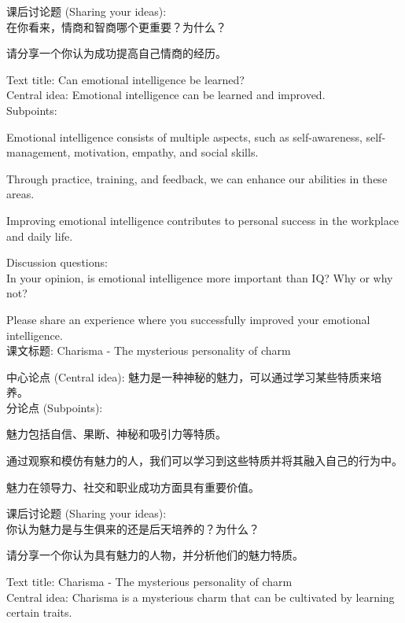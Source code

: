 \documentclass[a4paper,UTF8]{article}
\begin{document}
课后讨论题 (Sharing your ideas):\\

在你看来，情商和智商哪个更重要？为什么？

请分享一个你认为成功提高自己情商的经历。

Text title: Can emotional intelligence be learned?\\

Central idea: Emotional intelligence can be learned and improved.\\

Subpoints:

Emotional intelligence consists of multiple aspects, such as self-awareness, self-management, motivation, empathy, and social skills.

Through practice, training, and feedback, we can enhance our abilities in these areas.

Improving emotional intelligence contributes to personal success in the workplace and daily life.

Discussion questions:\\

In your opinion, is emotional intelligence more important than IQ? Why or why not?

Please share an experience where you successfully improved your emotional intelligence.\\

课文标题: Charisma - The mysterious personality of charm

中心论点 (Central idea): 魅力是一种神秘的魅力，可以通过学习某些特质来培养。\\

分论点 (Subpoints):

魅力包括自信、果断、神秘和吸引力等特质。

通过观察和模仿有魅力的人，我们可以学习到这些特质并将其融入自己的行为中。

魅力在领导力、社交和职业成功方面具有重要价值。

课后讨论题 (Sharing your ideas):\\

你认为魅力是与生俱来的还是后天培养的？为什么？

请分享一个你认为具有魅力的人物，并分析他们的魅力特质。

Text title: Charisma - The mysterious personality of charm\\

Central idea: Charisma is a mysterious charm that can be cultivated by learning certain traits.\\
\end{document}

